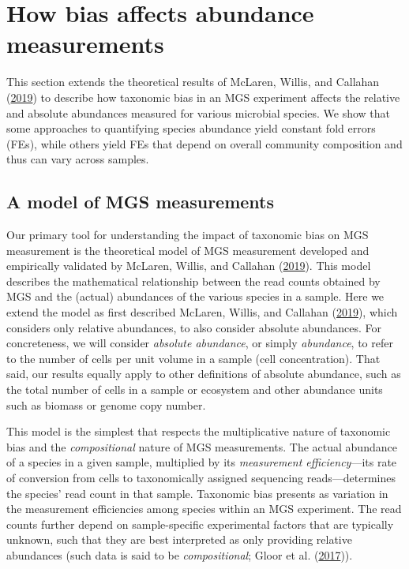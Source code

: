 \documentclass[
]{article}
\begin{document}
\hypertarget{abundance-measurement}{%
\section{How bias affects abundance measurements}\label{abundance-measurement}}

This section extends the theoretical results of McLaren, Willis, and Callahan (\protect\hyperlink{ref-mclaren2019cons}{2019}) to describe how taxonomic bias in an MGS experiment affects the relative and absolute abundances measured for various microbial species.
We show that some approaches to quantifying species abundance yield constant fold errors (FEs), while others yield FEs that depend on overall community composition and thus can vary across samples.

\hypertarget{a-model-of-mgs-measurements}{%
\subsection{A model of MGS measurements}\label{a-model-of-mgs-measurements}}

Our primary tool for understanding the impact of taxonomic bias on MGS measurement is the theoretical model of MGS measurement developed and empirically validated by McLaren, Willis, and Callahan (\protect\hyperlink{ref-mclaren2019cons}{2019}).
This model describes the mathematical relationship between the read counts obtained by MGS and the (actual) abundances of the various species in a sample.
Here we extend the model as first described McLaren, Willis, and Callahan (\protect\hyperlink{ref-mclaren2019cons}{2019}), which considers only relative abundances, to also consider absolute abundances.
For concreteness, we will consider \emph{absolute abundance}, or simply \emph{abundance}, to refer to the number of cells per unit volume in a sample (cell concentration).
That said, our results equally apply to other definitions of absolute abundance, such as the total number of cells in a sample or ecosystem and other abundance units such as biomass or genome copy number.

This model is the simplest that respects the multiplicative nature of taxonomic bias and the \emph{compositional} nature of MGS measurements.
The actual abundance of a species in a given sample, multiplied by its \emph{measurement efficiency}---its rate of conversion from cells to taxonomically assigned sequencing reads---determines the species' read count in that sample.
Taxonomic bias presents as variation in the measurement efficiencies among species within an MGS experiment.
The read counts further depend on sample-specific experimental factors that are typically unknown, such that they are best interpreted as only providing relative abundances (such data is said to be \emph{compositional}; Gloor et al. (\protect\hyperlink{ref-gloor2017micr}{2017})).
\end{document}

